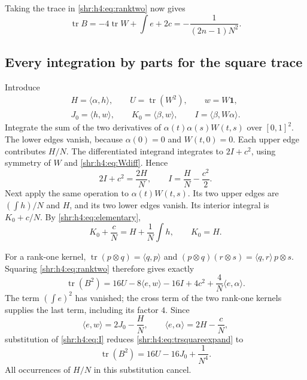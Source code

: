 \documentclass[11pt,letterpaper]{article}
\numberwithin{equation}{section}
\theoremstyle{definition}
\newcommand{\1}{\mathbf 1}
\newcommand{\one}{\mathbf1}
\newcommand{\ip}[2]{\langle #1,#2\rangle}
\DeclareMathOperator{\tr}{tr}
\begin{document}
Taking the trace in \eqref{shr:h4:eq:ranktwo} now gives
\begin{equation}
 \tr B=-4\tr W+\int e+2c
       =-\frac1{(2n-1)N^2}.
 \label{shr:h4:eq:trB}
\end{equation}

\subsection{Every integration by parts for the square trace}
Introduce
\begin{equation}
 \begin{gathered}
 H=\ip\alpha h,\qquad U=\tr(W^2),\qquad w=W\one,\\
 J_0=\ip h w,\qquad K_0=\ip\beta w,\qquad I=\ip\beta{W\alpha}.
 \end{gathered}
 \label{shr:h4:eq:scalars}
\end{equation}
Integrate the sum of the two derivatives of
$\alpha(t)\alpha(s)W(t,s)$ over $[0,1]^2$. The lower edges vanish, because
$\alpha(0)=0$ and $W(t,0)=0$. Each upper edge contributes $H/N$.
The differentiated integrand integrates to $2I+c^2$, using symmetry of
$W$ and \eqref{shr:h4:eq:Wdiff}. Hence
\begin{equation}
 2I+c^2=\frac{2H}N,\qquad I=\frac HN-\frac{c^2}2.
 \label{shr:h4:eq:I}
\end{equation}
Next apply the same operation to $\alpha(t)W(t,s)$. Its two upper edges
are $(\int h)/N$ and $H$, and its two lower edges vanish. Its interior
integral is $K_0+c/N$. By \eqref{shr:h4:eq:elementary},
\begin{equation}
 K_0+\frac cN=H+\frac1N\int h,
 \qquad K_0=H.
 \label{shr:h4:eq:K0}
\end{equation}

For a rank-one kernel, $\tr(p\otimes q)=\ip qp$ and
$(p\otimes q)(r\otimes s)=\ip qr\,p\otimes s$.
Squaring \eqref{shr:h4:eq:ranktwo} therefore gives exactly
\begin{equation}
 \tr(B^2)=16U-8\ip e w-16I+4c^2+\frac4N\ip e\alpha.
 \label{shr:h4:eq:trsquareexpand}
\end{equation}
The term $(\int e)^2$ has vanished; the cross term of the two rank-one
kernels supplies the last term, including its factor $4$. Since
\[
 \ip e w=2J_0-\frac HN,\qquad
 \ip e\alpha=2H-\frac cN,
\]
substitution of \eqref{shr:h4:eq:I} reduces \eqref{shr:h4:eq:trsquareexpand} to
\begin{equation}
 \tr(B^2)=16U-16J_0+\frac1{N^4}.
 \label{shr:h4:eq:trsquareJ}
\end{equation}
All occurrences of $H/N$ in this substitution cancel.
\end{document}

